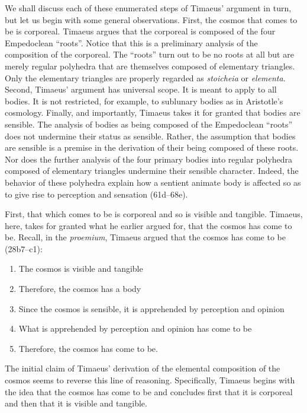 We shall discuss each of these enumerated steps of Timaeus' argument in turn, but let us begin with some general observations. First, the cosmos that comes to be is corporeal. Timaeus argues that the corporeal is composed of the four Empedoclean ``roots''. Notice that this is a preliminary analysis of the composition of the corporeal. The ``roots'' turn out to be no roots at all but are merely regular polyhedra that are themselves composed of elementary triangles. Only the elementary triangles are properly regarded as \emph{stoicheia} or \emph{elementa}. Second, Timaeus' argument has universal scope. It is meant to apply to all bodies. It is not restricted, for example, to sublunary bodies as in Aristotle's cosmology. Finally, and importantly, Timaeus takes it for granted that bodies are sensible. The analysis of bodies as being composed of the Empedoclean ``roots'' does not undermine their status as sensible. Rather, the assumption that bodies are sensible is a premise in the derivation of their being composed of these roots. Nor does the further analysis of the four primary bodies into regular polyhedra composed of elementary triangles undermine their sensible character. Indeed, the behavior of these polyhedra explain how a sentient animate body is affected so as to give rise to perception and sensation (61d--68e). 

First, that which comes to be is corporeal and so is visible and tangible. Timaeus, here, takes for granted what he earlier argued for, that the cosmos has come to be. Recall, in the \emph{proemium}, Timaeus argued that the cosmos has come to be (28b7--c1):
\begin{enumerate}
	\item The cosmos is visible and tangible
	\item Therefore, the cosmos has a body
	\item Since the cosmos is sensible, it is apprehended by perception and opinion
	\item What is apprehended by perception and opinion has come to be
	\item Therefore, the cosmos has come to be.
\end{enumerate}
The initial claim of Timaeus' derivation of the elemental composition of the cosmos seems to reverse this line of reasoning. Specifically, Timaeus begins with the idea that the cosmos has come to be and concludes first that it is corporeal and then that it is visible and tangible.

